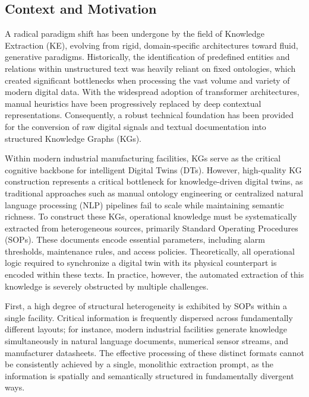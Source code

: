 ﻿\documentclass[11pt]{article}
\begin{document}
\subsection{Context and Motivation}
A radical paradigm shift has been undergone by the field of Knowledge Extraction (KE), evolving from rigid, domain-specific architectures toward fluid, generative paradigms. Historically, the identification of predefined entities and relations within unstructured text was heavily reliant on fixed ontologies, which created significant bottlenecks when processing the vast volume and variety of modern digital data. With the widespread adoption of transformer architectures, manual heuristics have been progressively replaced by deep contextual representations. Consequently, a robust technical foundation has been provided for the conversion of raw digital signals and textual documentation into structured Knowledge Graphs (KGs).

Within modern industrial manufacturing facilities, KGs serve as the critical cognitive backbone for intelligent Digital Twins (DTs). However, high-quality KG construction represents a critical bottleneck for knowledge-driven digital twins, as traditional approaches such as manual ontology engineering or centralized natural language processing (NLP) pipelines fail to scale while maintaining semantic richness. To construct these KGs, operational knowledge must be systematically extracted from heterogeneous sources, primarily Standard Operating Procedures (SOPs). These documents encode essential parameters, including alarm thresholds, maintenance rules, and access policies. Theoretically, all operational logic required to synchronize a digital twin with its physical counterpart is encoded within these texts. In practice, however, the automated extraction of this knowledge is severely obstructed by multiple challenges.

First, a high degree of structural heterogeneity is exhibited by SOPs within a single facility. Critical information is frequently dispersed across fundamentally different layouts; for instance, modern industrial facilities generate knowledge simultaneously in natural language documents, numerical sensor streams, and manufacturer datasheets. The effective processing of these distinct formats cannot be consistently achieved by a single, monolithic extraction prompt, as the information is spatially and semantically structured in fundamentally divergent ways. 
\end{document}
